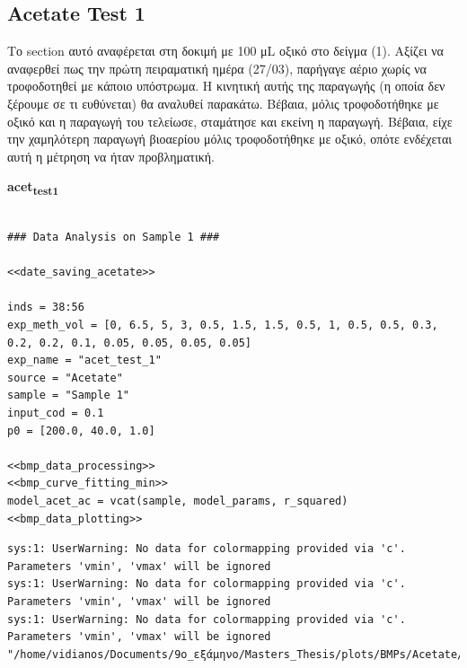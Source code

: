 \documentclass[11pt]{article}
\begin{document}
\subsection{Acetate Test 1}
\label{sec:org0c9e7de}
Το section αυτό αναφέρεται στη δοκιμή με 100 μL οξικό στο δείγμα (1). Aξίζει να αναφερθεί πως την πρώτη πειραματική ημέρα (27/03), παρήγαγε αέριο χωρίς να τροφοδοτηθεί με κάποιο υπόστρωμα. Η κινητική αυτής της παραγωγής (η οποία δεν ξέρουμε σε τι ευθύνεται) θα αναλυθεί παρακάτω. Βέβαια, μόλις τροφοδοτήθηκε με οξικό και η παραγωγή του τελείωσε, σταμάτησε και εκείνη η παραγωγή. Βέβαια, είχε την χαμηλότερη παραγωγή βιοαερίου μόλις τροφοδοτήθηκε με οξικό, οπότε ενδέχεται αυτή η μέτρηση να ήταν προβληματική.

\textbf{acet\textsubscript{test}\textsubscript{1}}
\begin{verbatim}

### Data Analysis on Sample 1 ###

<<date_saving_acetate>>

inds = 38:56
exp_meth_vol = [0, 6.5, 5, 3, 0.5, 1.5, 1.5, 0.5, 1, 0.5, 0.5, 0.3, 0.2, 0.2, 0.1, 0.05, 0.05, 0.05, 0.05]
exp_name = "acet_test_1"
source = "Acetate"
sample = "Sample 1"
input_cod = 0.1
p0 = [200.0, 40.0, 1.0]

<<bmp_data_processing>>
<<bmp_curve_fitting_min>>
model_acet_ac = vcat(sample, model_params, r_squared)
<<bmp_data_plotting>>
\end{verbatim}

\begin{verbatim}
sys:1: UserWarning: No data for colormapping provided via 'c'. Parameters 'vmin', 'vmax' will be ignored
sys:1: UserWarning: No data for colormapping provided via 'c'. Parameters 'vmin', 'vmax' will be ignored
sys:1: UserWarning: No data for colormapping provided via 'c'. Parameters 'vmin', 'vmax' will be ignored
"/home/vidianos/Documents/9o_εξάμηνο/Masters_Thesis/plots/BMPs/Acetate/methane_kinetics_acet_test_1.png"
\end{verbatim}
\end{document}

